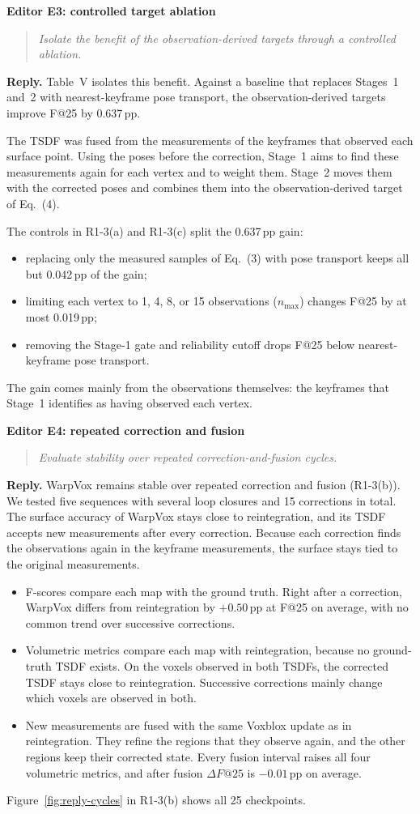 \documentclass[11pt,a4paper]{article}
\newcommand{\point}[2]{\par\medskip\textbf{#1}\par\begin{quote}\itshape #2\end{quote}}
\newenvironment{reply}{\begingroup\color{replyblue}\textbf{Reply.} }{\par\endgroup}
\begin{document}
\point{Editor E3: controlled target ablation}{Isolate the benefit of the observation-derived targets through a controlled ablation.}
\begin{reply}
Table~V isolates this benefit. Against a baseline that replaces Stages~1 and~2 with nearest-keyframe pose transport, the observation-derived targets improve F@25 by 0.637\,pp.

The TSDF was fused from the measurements of the keyframes that observed each surface point. Using the poses before the correction, Stage~1 aims to find these measurements again for each vertex and to weight them. Stage~2 moves them with the corrected poses and combines them into the observation-derived target of Eq.~(4).

The controls in R1-3(a) and R1-3(c) split the 0.637\,pp gain:
\begin{itemize}[leftmargin=*,topsep=2pt,itemsep=2pt]
\item replacing only the measured samples of Eq.~(3) with pose transport keeps all but 0.042\,pp of the gain;
\item limiting each vertex to 1, 4, 8, or 15 observations ($n_{\max}$) changes F@25 by at most 0.019\,pp;
\item removing the Stage-1 gate and reliability cutoff drops F@25 below nearest-keyframe pose transport.
\end{itemize}
The gain comes mainly from the observations themselves: the keyframes that Stage~1 identifies as having observed each vertex.
\end{reply}
\point{Editor E4: repeated correction and fusion}{Evaluate stability over repeated correction-and-fusion cycles.}
\begin{reply}
WarpVox remains stable over repeated correction and fusion (R1-3(b)). We tested five sequences with several loop closures and 15 corrections in total. The surface accuracy of WarpVox stays close to reintegration, and its TSDF accepts new measurements after every correction. Because each correction finds the observations again in the keyframe measurements, the surface stays tied to the original measurements.
\begin{itemize}[leftmargin=*,topsep=2pt,itemsep=2pt]
\item F-scores compare each map with the ground truth. Right after a correction, WarpVox differs from reintegration by $+0.50$\,pp at F@25 on average, with no common trend over successive corrections.
\item Volumetric metrics compare each map with reintegration, because no ground-truth TSDF exists. On the voxels observed in both TSDFs, the corrected TSDF stays close to reintegration. Successive corrections mainly change which voxels are observed in both.
\item New measurements are fused with the same Voxblox update as in reintegration. They refine the regions that they observe again, and the other regions keep their corrected state. Every fusion interval raises all four volumetric metrics, and after fusion $\Delta F@25$ is $-0.01$\,pp on average.
\end{itemize}
Figure~\ref{fig:reply-cycles} in R1-3(b) shows all 25 checkpoints.
\end{reply}
\end{document}
